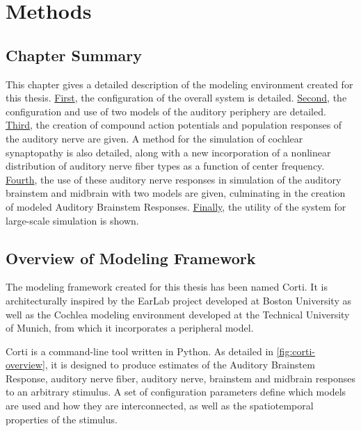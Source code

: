 \chapter{Methods}
\label{chapter:Methods}
\thispagestyle{myheadings}

\graphicspath{{4_Methods/Figures/}}

\section{Chapter Summary} %
\label{sec:methodsummary}
This chapter gives a detailed description of the modeling environment created for this thesis.  \hyperref[sec:overview_of_modeling_framework]{First}, the configuration of the overall system is detailed.  \hyperref[sec:peripheral_models]{Second}, the configuration and use of two models of the auditory periphery are detailed.  \hyperref[sec:auditory_nerve_response_models]{Third}, the creation of compound action potentials and population responses of the auditory nerve are given.  A method for the simulation of cochlear synaptopathy is also detailed, along with a new incorporation of a nonlinear distribution of auditory nerve fiber types as a function of center frequency.  \hyperref[sec:brainstem_models]{Fourth}, the use of these auditory nerve responses in simulation of the auditory brainstem and midbrain with two models are given, culminating in the creation of modeled Auditory Brainstem Responses.  \hyperref[sub:automated_parameter_exploration]{Finally}, the utility of the system for large-scale simulation is shown. 

\section{Overview of Modeling Framework} %
\label{sec:overview_of_modeling_framework}
The modeling framework created for this thesis has been named Corti\citep{Voysey2016Corti}. It is architecturally inspired by the EarLab project developed at Boston University as well as the Cochlea\citep{Rudnicki2014Cochlea} modeling environment developed at the Technical University of Munich, from which it incorporates a peripheral model.

Corti is a command-line tool written in Python. As detailed in \autoref{fig:corti-overview}, it is designed to produce estimates of the Auditory Brainstem Response, auditory nerve fiber, auditory nerve, brainstem and midbrain responses to an arbitrary stimulus.  A set of configuration parameters define which models are used and how they are interconnected, as well as the spatiotemporal properties of the stimulus.


